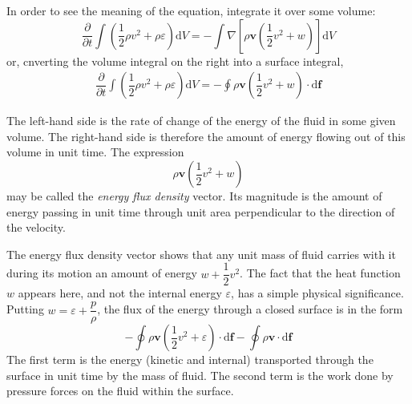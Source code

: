 \documentclass[conference]{IEEEtran}
\theoremstyle{definition}
\theoremstyle{remark}
\begin{document}
    In order to see the meaning of the equation, integrate it over some volume:
    \begin{equation*}
        \dfrac{\partial}{\partial t} \int \left( \dfrac12 \rho v^2 + \rho \varepsilon \right) \mathrm{d} V = -\int \nabla \left[ \rho \mathbf{v} \left(\dfrac12 v^2 + w\right) \right] \mathrm{d} V
    \end{equation*}
    or, cnverting the volume integral on the right into a surface integral,
    \begin{align}
        \dfrac{\partial}{\partial t} \int \left( \dfrac12 \rho v^2 + \rho \varepsilon \right) \mathrm{d} V = -\oint \rho \mathbf{v} \left( \dfrac12 v^2 + w \right) \cdot \mathrm{d} \mathbf{f}
    \end{align}
    
    The left-hand side is the rate of change of the energy of the fluid in some given volume. The right-hand side is therefore the amount of energy flowing out of this volume in unit time. The expression
    \begin{equation}
        \rho \mathbf{v} \left( \dfrac12 v^2 + w \right)
    \end{equation}
    may be called the \emph{energy flux density} vector. Its magnitude is the amount of energy passing in unit time through unit area perpendicular to the direction of the velocity.

    The energy flux density vector shows that any unit mass of fluid carries with it during its motion an amount of energy $w + \dfrac12 v^2$. The fact that the heat function $w$ appears here, and not the internal energy $\varepsilon$, has a simple physical significance. Putting $w = \varepsilon + \dfrac{p}\rho$, the flux of the energy through a closed surface is in the form
    \[
        -\oint \rho \mathbf{v} \left( \dfrac12 v^2 + \varepsilon \right) \cdot \mathrm{d} \mathbf{f} - \oint \rho \mathbf{v} \cdot \mathrm{d} \mathbf{f}
    \]
    The first term is the energy (kinetic and internal) transported through the surface in unit time by the mass of fluid. The second term is the work done by pressure forces on the fluid within the surface.

    
    
\end{document}
